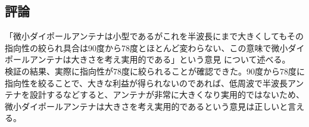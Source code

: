 \documentclass[dvipdfmx,autodetect-engine,titlepage]{jsarticle}
\begin{document}
\subsection{評論}
「微小ダイポールアンテナは小型であるがこれを半波長にまで大きくしてもその指向性の絞られ具合は90度から78度とほとんど変わらない、この意味で微小ダイポールアンテナは大きさを考え実用的である」という意見
について述べる。\\

検証の結果、実際に指向性が78度に絞られることが確認できた。90度から78度に指向性を絞ることで、大きな利益が得られないのであれば、低周波で半波長アンテナを設計するなどすると、アンテナが非常に大きくなり実用的ではないため、微小ダイポールアンテナは大きさを考え実用的であるという意見は正しいと言える。
\end{document}
